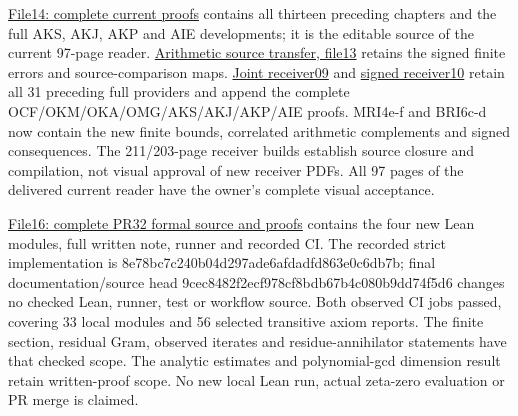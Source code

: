 \documentclass[
]{article}
\begin{document}
\href{https://github.com/KokunoYumeto/zeta-function-research-reader/blob/41adc412ceb119ad9086b1f106e377f3de2d401a/workbenches/splitzero-tandem/continuations/20260914-conductor-kernel-continuation/14_CURRENT_KERNEL_AND_MULTIPLICITY_PROOFS.tex}{File14:
complete current proofs} contains all thirteen preceding chapters and
the full AKS, AKJ, AKP and AIE developments; it is the editable source
of the current 97-page reader.
\href{https://github.com/KokunoYumeto/zeta-function-research-reader/blob/41adc412ceb119ad9086b1f106e377f3de2d401a/workbenches/splitzero-tandem/continuations/20260914-conductor-kernel-continuation/13_ARITHMETIC_MIXED_TRANSFER.tex}{Arithmetic
source transfer, file13} retains the signed finite errors and
source-comparison maps.
\href{https://github.com/KokunoYumeto/zeta-function-research-reader/blob/41adc412ceb119ad9086b1f106e377f3de2d401a/workbenches/splitzero-tandem/continuations/20260914-conductor-kernel-continuation/09_UPDATED_JOINT_NOTE.tex}{Joint
receiver09} and
\href{https://github.com/KokunoYumeto/zeta-function-research-reader/blob/41adc412ceb119ad9086b1f106e377f3de2d401a/workbenches/splitzero-tandem/continuations/20260914-conductor-kernel-continuation/10_UPDATED_SIGNED_RETURN.tex}{signed
receiver10} retain all 31 preceding full providers and append the
complete OCF/OKM/OKA/OMG/AKS/AKJ/AKP/AIE proofs. MRI4e-f and BRI6c-d now
contain the new finite bounds, correlated arithmetic complements and
signed consequences. The 211/203-page receiver builds establish source
closure and compilation, not visual approval of new receiver PDFs. All
97 pages of the delivered current reader have the owner's complete
visual acceptance.

\href{https://github.com/KokunoYumeto/zeta-function-research-reader/blob/41adc412ceb119ad9086b1f106e377f3de2d401a/workbenches/splitzero-tandem/continuations/20260914-conductor-kernel-continuation/16_PR32_FORMAL_SOURCE_AND_PROOFS.md}{File16:
complete PR32 formal source and proofs} contains the four new Lean
modules, full written note, runner and recorded CI. The recorded strict
implementation is 8e78bc7c240b04d297ade6afdadfd863e0c6db7b; final
documentation/source head 9cec8482f2ecf978cf8bdb67b4c080b9dd74f5d6
changes no checked Lean, runner, test or workflow source. Both observed
CI jobs passed, covering 33 local modules and 56 selected transitive
axiom reports. The finite section, residual Gram, observed iterates and
residue-annihilator statements have that checked scope. The analytic
estimates and polynomial-gcd dimension result retain written-proof
scope. No new local Lean run, actual zeta-zero evaluation or PR merge is
claimed.
\end{document}
